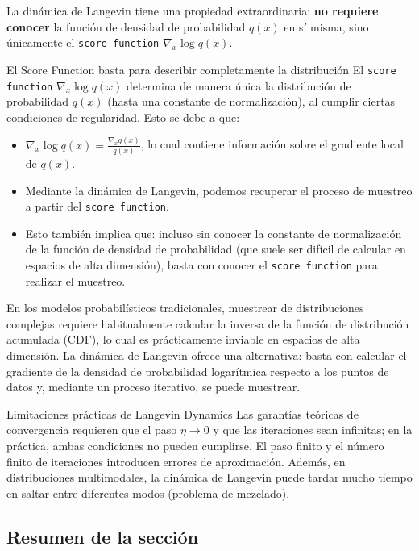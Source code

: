 \documentclass[a4paper]{article}
\begin{document}
La dinámica de Langevin tiene una propiedad extraordinaria: \textbf{no requiere conocer} la función de densidad de probabilidad $q(x)$ en sí misma, sino únicamente el \texttt{score function} $\nabla_x \log q(x)$.

\begin{importantbox}{El Score Function basta para describir completamente la distribución}
El \texttt{score function} $\nabla_x \log q(x)$ determina de manera única la distribución de probabilidad $q(x)$ (hasta una constante de normalización), al cumplir ciertas condiciones de regularidad. Esto se debe a que:
\begin{itemize}
    \item $\nabla_x \log q(x) = \frac{\nabla_x q(x)}{q(x)}$, lo cual contiene información sobre el gradiente local de $q(x)$.
    \item Mediante la dinámica de Langevin, podemos recuperar el proceso de muestreo a partir del \texttt{score function}.
    \item Esto también implica que: incluso sin conocer la constante de normalización de la función de densidad de probabilidad (que suele ser difícil de calcular en espacios de alta dimensión), basta con conocer el \texttt{score function} para realizar el muestreo.
\end{itemize}
\end{importantbox}

En los modelos probabilísticos tradicionales, muestrear de distribuciones complejas requiere habitualmente calcular la inversa de la función de distribución acumulada (CDF), lo cual es prácticamente inviable en espacios de alta dimensión. La dinámica de Langevin ofrece una alternativa: basta con calcular el gradiente de la densidad de probabilidad logarítmica respecto a los puntos de datos y, mediante un proceso iterativo, se puede muestrear.

\begin{warningbox}{Limitaciones prácticas de Langevin Dynamics}
Las garantías teóricas de convergencia requieren que el paso $\eta \to 0$ y que las iteraciones sean infinitas; en la práctica, ambas condiciones no pueden cumplirse. El paso finito y el número finito de iteraciones introducen errores de aproximación. Además, en distribuciones multimodales, la dinámica de Langevin puede tardar mucho tiempo en saltar entre diferentes modos (problema de mezclado).
\end{warningbox}

\subsection{Resumen de la sección}
\end{document}

